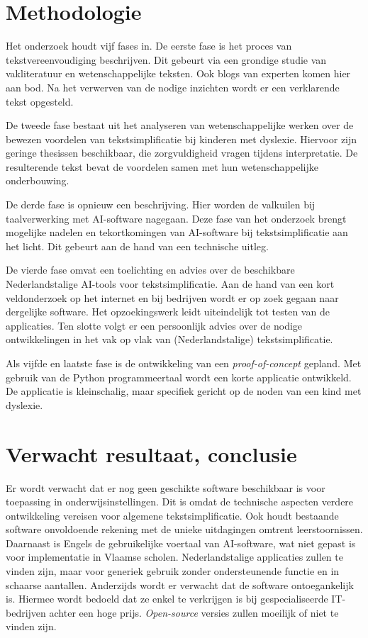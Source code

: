 \section{Methodologie}%
\label{sec:methodologie}

Het onderzoek houdt vijf fases in. De eerste fase is het proces van tekstvereenvoudiging beschrijven. Dit gebeurt via een grondige studie van vakliteratuur en wetenschappelijke teksten. Ook blogs van experten komen hier aan bod. Na het verwerven van de nodige inzichten wordt er een verklarende tekst opgesteld.

De tweede fase bestaat uit het analyseren van wetenschappelijke werken over de bewezen voordelen van tekstsimplificatie bij kinderen met dyslexie. Hiervoor zijn geringe thesissen beschikbaar, die zorgvuldigheid vragen tijdens interpretatie. De resulterende tekst bevat de voordelen samen met hun wetenschappelijke onderbouwing.

De derde fase is opnieuw een beschrijving. Hier worden de valkuilen bij taalverwerking met AI-software nagegaan. Deze fase van het onderzoek brengt mogelijke nadelen en tekortkomingen van AI-software bij tekstsimplificatie aan het licht. Dit gebeurt aan de hand van een technische uitleg.

De vierde fase omvat een toelichting en advies over de beschikbare Nederlandstalige AI-tools voor tekstsimplificatie. Aan de hand van een kort veldonderzoek op het internet en bij bedrijven wordt er op zoek gegaan naar dergelijke software. Het opzoekingswerk leidt uiteindelijk tot testen van de applicaties. Ten slotte volgt er een persoonlijk advies over de nodige ontwikkelingen in het vak op vlak van (Nederlandstalige) tekstsimplificatie.

Als vijfde en laatste fase is de ontwikkeling van een \textit{proof-of-concept} gepland. Met gebruik van de Python programmeertaal wordt een korte applicatie ontwikkeld. De applicatie is kleinschalig, maar specifiek gericht op de noden van een kind met dyslexie. 


\section{Verwacht resultaat, conclusie}%
\label{sec:verwachte_resultaten}

Er wordt verwacht dat er nog geen geschikte software beschikbaar is voor toepassing in onderwijsinstellingen. Dit is omdat de technische aspecten verdere ontwikkeling vereisen voor algemene tekstsimplificatie. Ook houdt bestaande software onvoldoende rekening met de unieke uitdagingen omtrent leerstoornissen. Daarnaast is Engels de gebruikelijke voertaal van AI-software, wat niet gepast is voor implementatie in Vlaamse scholen. Nederlandstalige applicaties zullen te vinden zijn, maar voor generiek gebruik zonder ondersteunende functie en in schaarse aantallen. Anderzijds wordt er verwacht dat de software ontoegankelijk is. Hiermee wordt bedoeld dat ze enkel te verkrijgen is bij gespecialiseerde IT-bedrijven achter een hoge prijs. \emph{Open-source} versies zullen moeilijk of niet te vinden zijn.